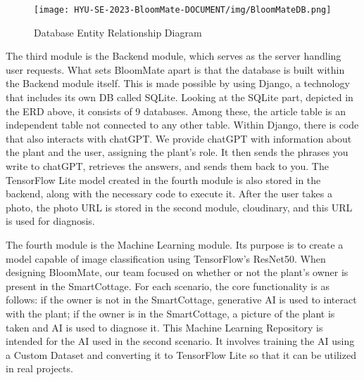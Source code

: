 \documentclass[conference, a4paper]{IEEEtran}
\begin{document}
    \begin{figure}[h]
    \centering
    \texttt{[image: HYU-SE-2023-BloomMate-DOCUMENT/img/BloomMateDB.png]}
    \label{fig}
    \caption{Database Entity Relationship Diagram}
    \end{figure}

The third module is the Backend module, which serves as the server handling user requests. What sets BloomMate apart is that the database is built within the Backend module itself. This is made possible by using Django, a technology that includes its own DB called SQLite. Looking at the SQLite part, depicted in the ERD above, it consists of 9 databases. Among these, the article table is an independent table not connected to any other table. Within Django, there is code that also interacts with chatGPT. We provide chatGPT with information about the plant and the user, assigning the plant's role. It then sends the phrases you write to chatGPT, retrieves the answers, and sends them back to you. The TensorFlow Lite model created in the fourth module is also stored in the backend, along with the necessary code to execute it. After the user takes a photo, the photo URL is stored in the second module, cloudinary, and this URL is used for diagnosis.
\newline

The fourth module is the Machine Learning module. Its purpose is to create a model capable of image classification using TensorFlow's ResNet50. When designing BloomMate, our team focused on whether or not the plant's owner is present in the SmartCottage. For each scenario, the core functionality is as follows: if the owner is not in the SmartCottage, generative AI is used to interact with the plant; if the owner is in the SmartCottage, a picture of the plant is taken and AI is used to diagnose it. This Machine Learning Repository is intended for the AI used in the second scenario. It involves training the AI using a Custom Dataset and converting it to TensorFlow Lite so that it can be utilized in real projects.
\end{document}
